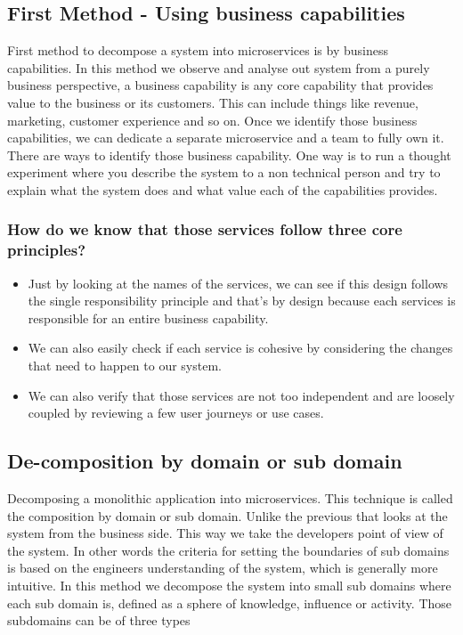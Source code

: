 \documentclass[a4paper, 11pt]{book}
\begin{document}
    \subsection{First Method - Using business capabilities}
    First method to decompose a system into microservices is by business capabilities.
    In this method we observe and analyse out system from a purely business perspective, a business capability is any core capability that provides value to the business or its customers.
    This can include things like revenue, marketing, customer experience and so on.
    Once we identify those business capabilities, we can dedicate a separate microservice and a team to fully own it.
    There are ways to identify those business capability.
    One way is to run a thought experiment where you describe the system to a non technical person and try to explain what the system does and what value each of the capabilities provides.


    \subsubsection{How do we know that those services follow three core principles?}
    \begin{itemize}
        \item Just by looking at the names of the services, we can see if this design follows the single responsibility principle and that's by design because each services is responsible for an entire business capability.
        \item We can also easily check if each service is cohesive by considering the changes that need to happen to our system.
        \item We can also verify that those services are not too independent and are loosely coupled by reviewing a few user journeys or use cases.
    \end{itemize}

    \subsection{De-composition by domain or sub domain}

    Decomposing a monolithic application into microservices.
    This technique is called the composition by domain or sub domain.
    Unlike the previous that looks at the system from the business side.
    This way we take the developers point of view of the system.
    In other words the criteria for setting the boundaries of sub domains is based on the engineers understanding of the system, which is generally more intuitive.
    In this method we decompose the system into small sub domains where each sub domain is, defined as a sphere of knowledge, influence or activity.
    Those subdomains can be of three types
\end{document}
